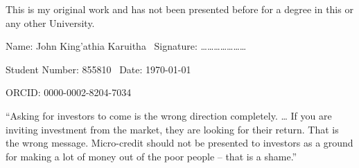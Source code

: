 \documentclass[a4paper, nobind]{templates/ociamthesis}
\begin{document}
\begin{romanpages}
\begin{declaration}
  This is my original work and has not been presented before for a degree in this or any other University.

  \vspace{25mm}

  Name: John King'athia Karuitha \hfill~Signature: \ldots \ldots \ldots \ldots \ldots \ldots \ldots

  \vspace{3mm}

  Student Number: 855810 \hfill~Date: \today

  \vspace{10mm}

  ORCID: 0000-0002-8204-7034
\end{declaration}

  \dominitoc %

\flushbottom

\tableofcontents

\listoffigures
	\mtcaddchapter

\listoftables
  \mtcaddchapter


\end{romanpages}

\flushbottom

\begin{savequote}
``Asking for investors to come is the wrong direction completely.
\ldots{} If you are inviting investment from the market, they are
looking for their return. That is the wrong message. Micro-credit should
not be presented to investors as a ground for making a lot of money out
of the poor people -- that is a shame.''
\end{savequote}
\end{document}
